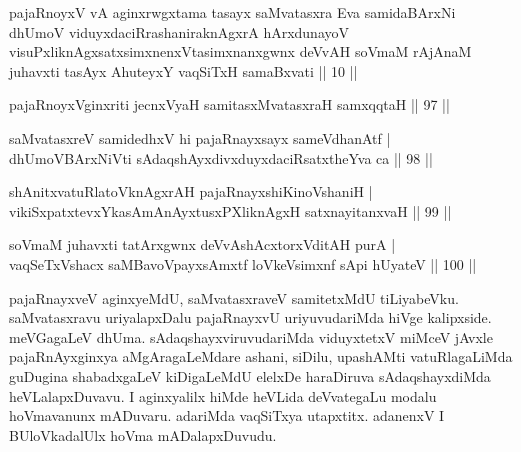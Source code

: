 

\begin{shl}
pajaRnoyxV vA aginxrwgxtama tasayx saMvatasxra Eva samidaBArxNi dhUmoV viduyxdaciRrashaniraknAgxrA hArxdunayoV visuPxliknAgxsatxsimxnenxVtasimxnanxgwnx deVvAH soVmaM rAjAnaM juhavxti tasAyx AhuteyxY vaqSiTxH samaBxvati || 10 ||
\end{shl}

\begin{shl}
pajaRnoyxV\s ginxriti jecnxVyaH samitasxMvatasxraH samxqqtaH \hfill|| 97 || 
\end{shl}

\begin{shl}
saMvatasxreV samidedhxV hi pajaRnayxsayx sameVdhanAtf | \\
dhUmoV\s BArxNiVti sAdaqshAyxdivxduyxdaciRsatxtheYva ca \hfill|| 98 || 
\end{shl}

\begin{shl}
shAnitxvatuRlatoV\s knAgxrAH pajaRnayxshiKinoV\s shaniH | \\
vikiSxpatxtevxYkasAmAnAyxtusxPXliknAgxH satxnayitanxvaH \hfill|| 99 || 
\end{shl}

\begin{shl}
soVmaM juhavxti tatArxgwnx deVvAshAcxtorxVditAH purA | \\
vaqSeTxVshacx saMBavoV\s payxsAmxtf loVkeV\s simxnf sApi hUyateV \hfill|| 100 || 
\end{shl}

\begin{artha}
pajaRnayxveV aginxyeMdU, saMvatasxraveV samitetxMdU tiLiyabeVku. 
saMvatasxravu uriyalapxDalu pajaRnayxvU uriyuvudariMda hiVge 
kalipxside. meVGagaLeV dhUma. sAdaqshayxviruvudariMda viduyxtetxV 
miMceV jAvxle pajaRnAyxginxya aMgAragaLeMdare ashani, siDilu, 
upashAMti vatuRlagaLiMda guDugina shabadxgaLeV kiDigaLeMdU elelxDe 
haraDiruva sAdaqshayxdiMda heVLalapxDuvavu. I aginxyalilx hiMde 
heVLida deVvategaLu modalu hoVmavanunx mADuvaru. adariMda vaqSiTxya 
utapxtitx. adanenxV I BUloVkadalUlx hoVma mADalapxDuvudu.
\end{artha}
